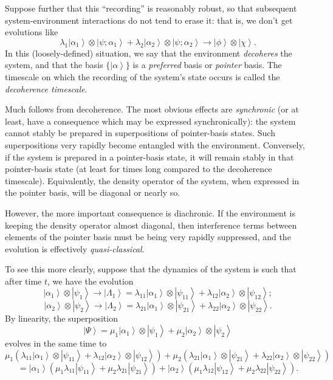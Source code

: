 \documentclass[12pt]{article}
\newcommand{\be}{\begin{equation}}
\newcommand{\ee}{\end{equation}}
\newcommand{\ket}[1]{\ensuremath{\left|  #1 \right\rangle}}
\newcommand{\tpk}[2]{\ensuremath{\ket{#1}\!\otimes\!\ket{#2}}}
\begin{document}
Suppose further that this ``recording'' is reasonably robust, so that subsequent system-environment interactions do not tend to erase it: that is, we don't get evolutions like
\be
\lambda_1 \tpk{\alpha_1}{\psi;\alpha_1}+\lambda_2 \tpk{\alpha_2}{\psi;\alpha_2}
\longrightarrow 
\tpk{\phi}{\chi}.
\ee
In this (loosely-defined) situation, we say that the environment \emph{decoheres} the system, and that the basis $\{\ket{\alpha}\}$ is a \emph{preferred} basis or \emph{pointer} basis. The timescale on which the recording of the system's state occurs is called the \emph{decoherence timescale}.

Much follows from decoherence. The most obvious effects are \emph{synchronic} (or at least, have a consequence which may be expressed synchronically):  the system cannot stably be prepared in superpositions of pointer-basis states. Such superpositions very rapidly become entangled with the environment. Conversely, if the system is prepared in a pointer-basis state, it will remain stably in that pointer-basis state (at least for times long compared to the decoherence timescale). Equivalently, the density operator of the system, when expressed in the pointer basis, will be diagonal or nearly so.

However, the more important consequence is diachronic. If the environment is keeping the density operator almost diagonal, then interference terms between elements of the pointer basis must be being very rapidly suppressed, and the evolution is effectively \emph{quasi-classical}. 

To see this more clearly, suppose that the dynamics of the system is such that after time $t$, we have the evolution
\be \label{DMWWdeco1}\tpk{\alpha_1}{\psi_1} \longrightarrow \ket{\Lambda_1}=\lambda_{11}\tpk{\alpha_1}{\psi_{11}}+\lambda_{12}\tpk{\alpha_2}{\psi_{12}};
\ee
\be \label{DMWWdeco2}\tpk{\alpha_2}{\psi_2} \longrightarrow \ket{\Lambda_2}=\lambda_{21}\tpk{\alpha_1}{\psi_{21}}+\lambda_{22}\tpk{\alpha_2}{\psi_{22}}.
\ee
By linearity, the superposition
\be \label{DMWWdecosup}
\ket{\Psi}=\mu_1 \tpk{\alpha_1}{\psi_1}
+\mu_2 \tpk{\alpha_2}{\psi_2}
\ee
evolves in the same time to
\[
\mu_1 \left( \lambda_{11}\tpk{\alpha_1}{\psi_{11}}+\lambda_{12}\tpk{\alpha_2}{\psi_{12}}\right)
+
\mu_2 \left( \lambda_{21}\tpk{\alpha_1}{\psi_{21}}+\lambda_{22}\tpk{\alpha_2}{\psi_{22}}\right)
\]
\be \label{DMWWdecoresult}
= \ket{\alpha_1}\left(   \mu_1 \lambda_{11}\ket{\psi_{11}}  +\mu_2 \lambda_{21}\ket{\psi_{21}}\right)
+\ket{\alpha_2}\left(   \mu_1 \lambda_{12}\ket{\psi_{12}}  +\mu_2 \lambda_{22}\ket{\psi_{22}}\right).
\ee
\end{document}
